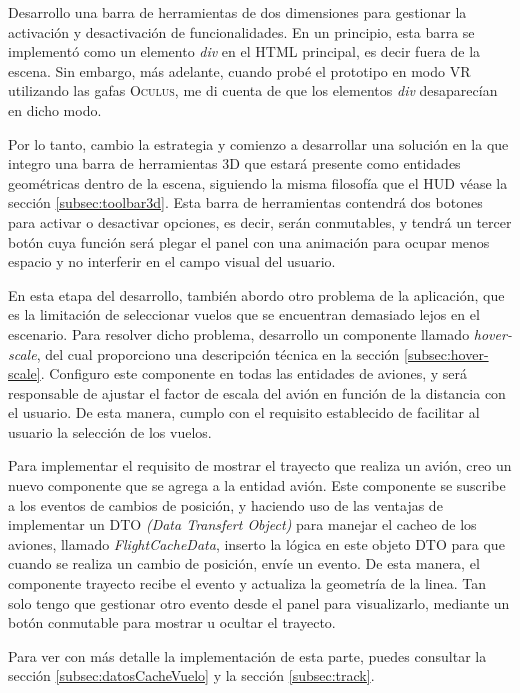 \documentclass[a4paper, 11pt]{book}
\begin{document}
Desarrollo una barra de herramientas de dos dimensiones para gestionar la activación y desactivación de funcionalidades. En un principio, esta barra se implementó como un elemento \emph{div} en el \textsc{HTML} principal, es decir fuera de la escena. Sin embargo, más adelante, cuando probé el prototipo en modo \textsc{VR} utilizando las gafas \textsc{Oculus}, me di cuenta de que los elementos \emph{div} desaparecían en dicho modo.

Por lo tanto, cambio la estrategia y comienzo a desarrollar una solución en la que integro una barra de herramientas \textsc{3D} que estará presente como entidades geométricas dentro de la escena, siguiendo la misma filosofía que el \textsc{\gls{HUD}} véase la sección \ref{subsec:toolbar3d}. Esta barra de herramientas contendrá dos botones para activar o desactivar opciones, es decir, serán conmutables, y tendrá un tercer botón cuya función será plegar el panel con una animación para ocupar menos espacio y no interferir en el campo visual del usuario.

En esta etapa del desarrollo, también abordo otro problema de la aplicación, que es la limitación de seleccionar vuelos que se encuentran demasiado lejos en el escenario. Para resolver dicho problema, desarrollo un componente llamado \emph{hover-scale}, del cual proporciono una descripción técnica en la sección \ref{subsec:hover-scale}. Configuro este componente en todas las entidades de aviones, y será responsable de ajustar el factor de escala del avión en función de la distancia con el usuario. De esta manera, cumplo con el requisito establecido de facilitar al usuario la selección de los vuelos.

Para implementar el requisito de mostrar el trayecto que realiza un avión, creo un nuevo componente que se agrega a la entidad avión. Este componente se suscribe a los eventos de cambios de posición, y haciendo uso de las ventajas de implementar un \textsc{\gls{DTO}} \emph{(Data Transfert Object)} para manejar el cacheo de los aviones, llamado \emph{FlightCacheData}, inserto la lógica en este objeto \textsc{DTO} para que cuando se realiza un cambio de posición, envíe un evento. De esta manera, el componente trayecto recibe el evento y actualiza la geometría de la linea. Tan solo tengo que gestionar otro evento desde el panel para visualizarlo, mediante un botón conmutable para mostrar u ocultar el trayecto.

Para ver con más detalle la implementación de esta parte, puedes consultar la sección \ref{subsec:datosCacheVuelo} y la sección \ref{subsec:track}.
\end{document}
